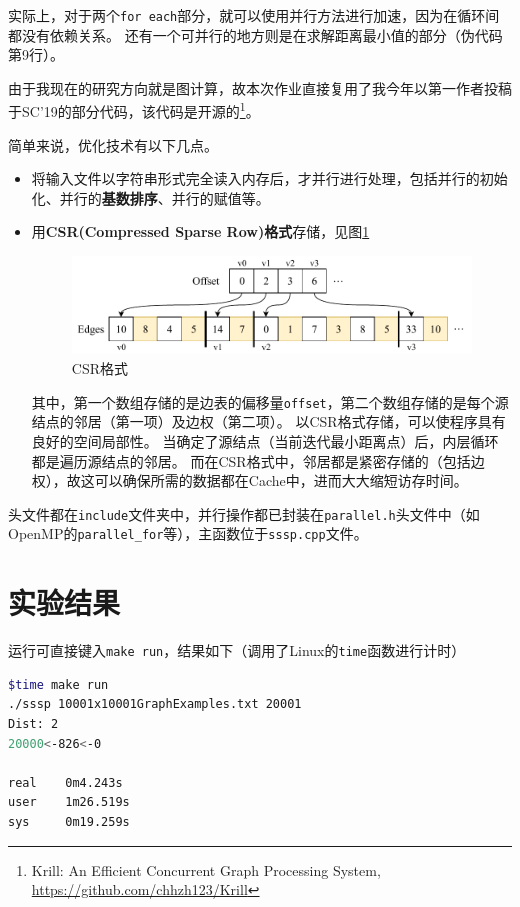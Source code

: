 \documentclass[reportComp]{thesis}
\begin{document}
实际上，对于两个\verb'for each'部分，就可以使用并行方法进行加速，因为在循环间都没有依赖关系。
还有一个可并行的地方则是在求解距离最小值的部分（伪代码第9行）。

由于我现在的研究方向就是图计算，故本次作业直接复用了我今年以第一作者投稿于SC'19的部分代码，该代码是开源的\footnote{Krill: An Efficient Concurrent Graph Processing System, \url{https://github.com/chhzh123/Krill}}。

简单来说，优化技术有以下几点。
\begin{itemize}
	\item 将输入文件以字符串形式完全读入内存后，才并行进行处理，包括并行的初始化、并行的\textbf{基数排序}、并行的赋值等。
	\item 用\textbf{CSR(Compressed Sparse Row)格式}存储，见图\ref{fig:csr}
	\begin{figure}[H]
	\centering
	\includegraphics[width=0.8\linewidth]{fig/CSR.pdf}
	\caption{CSR格式}
	\label{fig:csr}
	\end{figure}
	其中，第一个数组存储的是边表的偏移量\verb'offset'，第二个数组存储的是每个源结点的邻居（第一项）及边权（第二项）。
	以CSR格式存储，可以使程序具有良好的空间局部性。
	当确定了源结点（当前迭代最小距离点）后，内层循环都是遍历源结点的邻居。
	而在CSR格式中，邻居都是紧密存储的（包括边权），故这可以确保所需的数据都在Cache中，进而大大缩短访存时间。
\end{itemize}

头文件都在\verb'include'文件夹中，并行操作都已封装在\verb'parallel.h'头文件中（如OpenMP的\verb'parallel_for'等），主函数位于\verb'sssp.cpp'文件。

\section{实验结果}
运行可直接键入\verb'make run'，结果如下（调用了Linux的\verb'time'函数进行计时）
\begin{lstlisting}[language=bash]
$time make run
./sssp 10001x10001GraphExamples.txt 20001
Dist: 2
20000<-826<-0

real    0m4.243s
user    1m26.519s
sys     0m19.259s
\end{lstlisting}
\end{document}
